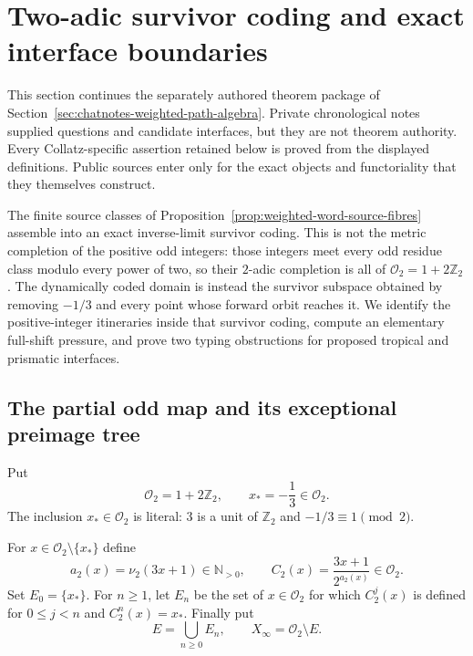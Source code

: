 \section{Two-adic survivor coding and exact interface boundaries}
\label{sec:two-adic-survivor-coding}

This section continues the separately authored theorem package of
Section~\ref{sec:chatnotes-weighted-path-algebra}.  Private chronological
notes supplied questions and candidate interfaces, but they are not theorem
authority.  Every Collatz-specific assertion retained below is proved from
the displayed definitions.  Public sources enter only for the exact objects
and functoriality that they themselves construct.

The finite source classes of
Proposition~\ref{prop:weighted-word-source-fibres} assemble into an exact
inverse-limit survivor coding.  This is not the metric completion of the
positive odd integers: those integers meet every odd residue class modulo
every power of two, so their $2$-adic completion is all of
$\mathcal O_2=1+2\mathbb Z_2$.  The dynamically coded domain is instead the
survivor subspace obtained by removing $-1/3$ and every point whose forward
orbit reaches it.  We identify the positive-integer itineraries inside that
survivor coding, compute an elementary full-shift pressure, and prove two
typing obstructions for proposed tropical and prismatic interfaces.

\subsection{The partial odd map and its exceptional preimage tree}

Put
\[
 \mathcal O_2=1+2\mathbb Z_2,
 \qquad x_*=-\frac13\in\mathcal O_2.
\]
The inclusion $x_*\in\mathcal O_2$ is literal: $3$ is a unit of
$\mathbb Z_2$ and $-1/3\equiv1\pmod2$.

\begin{definition}
\label{def:two-adic-survivor-space}
For $x\in\mathcal O_2\setminus\{x_*\}$ define
\[
 a_2(x)=\nu_2(3x+1)\in\mathbb N_{>0},
 \qquad
 C_2(x)=\frac{3x+1}{2^{a_2(x)}}\in\mathcal O_2.
\]
Set $E_0=\{x_*\}$.  For $n\geq1$, let $E_n$ be the set of
$x\in\mathcal O_2$ for which $C_2^j(x)$ is defined for $0\leq j<n$ and
$C_2^n(x)=x_*$.  Finally put
\begin{equation}
\label{eq:two-adic-exceptional-set}
 E=\bigcup_{n\geq0}E_n,
 \qquad
 X_\infty=\mathcal O_2\setminus E.
\end{equation}
\end{definition}

